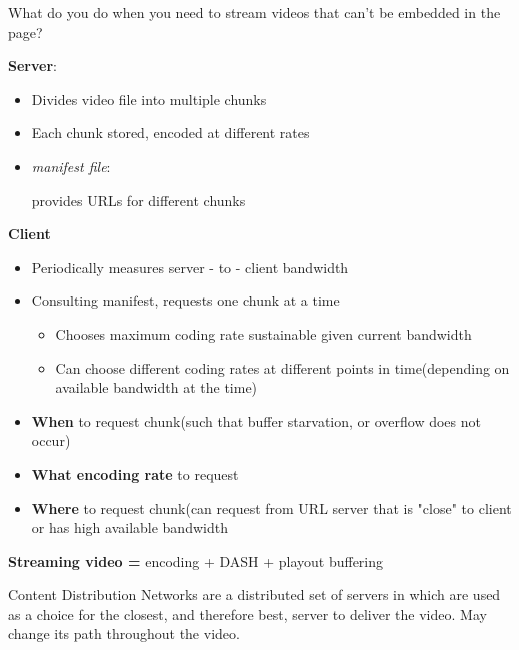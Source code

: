 \documentclass[12pt] {report}
\begin{document}
What do
    you do
        when you need to stream videos that can't be embedded in the page?
{
\textbf{Server}:

    \begin{itemize}
    \item Divides video file into multiple chunks
    \item Each chunk stored, encoded at different rates
\item \textit{manifest file}:

    provides URLs for different chunks
    \end{itemize}

\textbf{Client}
\begin{itemize}
\item Periodically measures server - to - client bandwidth
\item Consulting manifest, requests one chunk at a time
\begin{itemize}
\item Chooses maximum coding rate sustainable given current bandwidth
\item Can choose different coding rates at different points in time(depending on available bandwidth at the time)
    \end{itemize}
    \item \textbf{When} to request chunk(such that buffer starvation, or overflow does not occur)
    \item \textbf{What encoding rate} to request
    \item \textbf{Where} to request chunk(can request from URL server that is "close" to client or has high available bandwidth
    \end{itemize}
    \textbf{Streaming video = } encoding + DASH + playout buffering
}

{

    Content Distribution Networks are a distributed set of servers in which are used as a choice for the closest, and therefore best, server to deliver the video. May change its path throughout the video.
}
\end{document}
